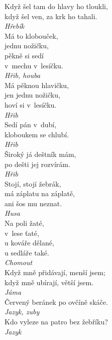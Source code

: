 \begin{multicols}{3}
\noindent
Když šel tam do hlavy ho tloukli,\\
když šel ven, za krk ho tahali.\\[1 mm]
{\sl Hřebík}\\

\noindent
Má to klobouček,\\
jednu nožičku,\\
pěkně si sedí\\
v~mechu v~lesíčku.\\[1 mm]
{\sl Hřib, houba}\\

\noindent
Má pěknou hlavičku,\\
jen jednu nožičku,\\
hoví si v~lesíčku.\\[1 mm]
{\sl Hřib}\\

\noindent
Sedí pán v~dubí,\\
kloboukem se chlubí.\\[1 mm]
{\sl Hřib}\\

\noindent
Široký já deštník mám,\\
po dešti jej rozvírám.\\[1 mm]
{\sl Hřib}\\

\noindent
Stojí, stojí žebrák,\\
má záplatu na záplatě,\\
ani šos mu neznat.\\[1 mm]
{\sl Husa}\\

\noindent
Na poli žaté,\\
v~lese ťaté,\\
u kováře dělané,\\
u sedláře také.\\[1 mm]
{\sl Chomout}\\

\noindent
Když mně přidávají, menší jsem;\\
když mně ubírají, větší jsem.\\[1 mm]
{\sl Jáma}\\

\noindent
Červený beránek po ovčíně skáče.\\[1 mm]
{\sl Jazyk, zuby}\\

\noindent
Kdo vyleze na patro bez žebříku?\\[1 mm]
{\sl Jazyk}\\


\end{multicols}
